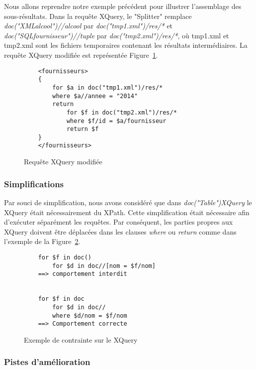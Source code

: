 \documentclass[a4paper,10pt]{article}
\newcommand{\fref}[1]{Figure~\ref{#1}}
\begin{document}
Nous allons reprendre notre exemple précédent pour illustrer l'assemblage des sous-résultats.
Dans la requête XQuery, le "Splitter" remplace \emph{doc("XMLalcool")//alcool} par \emph{doc("tmp1.xml")/res/*} et \emph{doc("SQLfournisseur")//tuple} par \emph{doc("tmp2.xml")/res/*}, où tmp1.xml et tmp2.xml sont les fichiers temporaires contenant les résultats intermédiaires.
La requête XQuery modifiée est représentée \fref{lst:requeteModifiee}.
\begin{figure}[ht!]
\begin{verbatim}
	<fournisseurs>
	{
		for $a in doc("tmp1.xml")/res/*
		where $a//annee = "2014"
		return
			for $f in doc("tmp2.xml")/res/*
			where $f/id = $a/fournisseur
			return $f	
	}
	</fournisseurs>
\end{verbatim}
\caption{Requête XQuery modifiée}
\label{lst:requeteModifiee}
\end{figure}




\subsubsection{Simplifications}

Par souci de simplification, nous avons considéré que dans \emph{doc("Table")XQuery} le XQuery était nécessairement du XPath. Cette simplification était nécessaire afin d'exécuter séparément les requêtes. Par conséquent, les parties propres aux XQuery doivent être déplacées dans les clauses \emph{where} ou \emph{return} comme dans l'exemple de la \fref{lst:contraintes}.


\begin{figure}[ht!]
\begin{verbatim}
	for $f in doc()
		for $d in doc//[nom = $f/nom]
    ==> comportement interdit
    
    
	for $f in doc
		for $d in doc//
		where $d/nom = $f/nom
	==> Comportement correcte
\end{verbatim}
\caption{Exemple de contrainte sur le XQuery}
\label{lst:contraintes}
\end{figure}



\subsubsection{Pistes d'amélioration}
\end{document}

